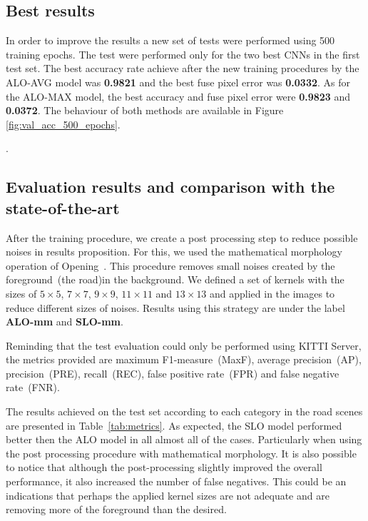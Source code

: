 \subsection{Best results}

In order to improve the results a new set of tests were performed using 500 training epochs. The test were performed only for the two best CNNs in the first test set. The best accuracy rate achieve after the new training procedures by the ALO-AVG model was \textbf{0.9821} and the best fuse pixel error was \textbf{0.0332}. As for the ALO-MAX model, the best accuracy and fuse pixel error were \textbf{0.9823} and \textbf{0.0372}. The behaviour of both methods are available in Figure \ref{fig:val_acc_500_epochs}.

{}.

{\color{green}{Adicionar informacao sobre os resultados do conjunto de testes}}

\subsection{Evaluation results and comparison with the state-of-the-art}

After the training procedure, we create a post processing step to reduce possible noises in results proposition. For this, we used the mathematical morphology operation of Opening~\cite{najman13}. This procedure removes small noises created by the foreground~(the road)in the background. We defined a set of kernels with the sizes of $5\times5$, $7\times7$, $9\times9$, $11\times11$ and $13\times13$ and applied in the images to reduce different sizes of noises. Results using this strategy are under the label \textbf{ALO-mm} and \textbf{SLO-mm}.

Reminding that the test evaluation could only be performed using KITTI Server, the metrics provided are maximum F1-measure~(MaxF), average precision~(AP), precision~(PRE), recall~(REC), false positive rate~(FPR) and false negative rate~(FNR). 

The results achieved  on the test set according to each category in the road scenes are presented in Table~\ref{tab:metrics}. As expected, the SLO model performed better then the ALO model in all almost all of the cases. Particularly when using the post processing procedure with mathematical morphology. It is also possible to notice that although the post-processing slightly improved the overall performance, it also increased the number of false negatives. This could be an indications that perhaps the applied kernel sizes are not adequate and are removing more of the foreground than the desired.   

